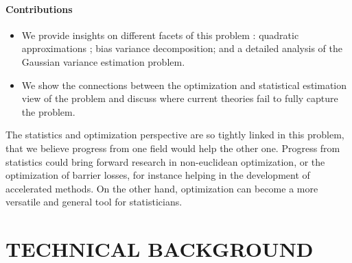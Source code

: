 \documentclass[twoside]{article}
\let\oldsection\section
\renewcommand{\section}[1]{\oldsection{\texorpdfstring{\uppercase{#1}}{#1}}}
\begin{document}
\paragraph{Contributions}
\begin{itemize}
	\item We provide insights on different facets of this problem : quadratic approximations ; bias variance decomposition; and a detailed analysis of the Gaussian variance estimation problem.
	\item We show the connections between the optimization and statistical estimation view of the problem and discuss where current theories fail to fully capture the problem.
\end{itemize}

The statistics and optimization perspective are so tightly linked in this problem, that we believe progress from one field would help the other one. 
Progress from statistics could bring forward research in non-euclidean optimization, or the optimization of barrier losses, for instance helping in the development of accelerated methods.
On the other hand, optimization can become  a more versatile and general tool for statisticians. %




\section{Technical background}
\end{document}
